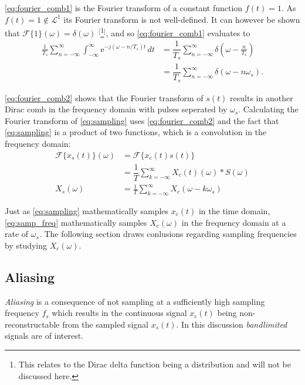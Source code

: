 \eqref{eq:fourier_comb1} is the Fourier transform of a constant function $f(t) = 1$. As $f(t) = 1 \notin \mathcal{L}^1$ its Fourier transform is not well-defined. It can however be shown that $\mathcal{F}\{1\}(\omega) = \delta(\omega)$ $^[$\footnote{This relates to the Dirac delta function being a distribution and will not be discussed here.}$^]$, and so \eqref{eq:fourier_comb1} evaluates to
\begin{align} \label{eq:fourier_comb2}
\frac{1}{T_s} \sum_{n=-\infty}^{\infty} \int_{-\infty}^{\infty} \! \mathrm{e}^{-j(\omega-n/T_s)t} \, dt &= \dfrac{1}{T_s}\sum_{n=-\infty}^{\infty} \delta(\omega-\frac{n}{T_s}) \nonumber \\
&= \dfrac{1}{T_s} \sum_{n=-\infty}^{\infty} \delta(\omega-n\omega_s).
\end{align}

\eqref{eq:fourier_comb2} shows that the Fourier transform of $s(t)$ results in another Dirac comb in the frequency domain with pulses seperated by $\omega_s$.
Calculating the Fourier transform of \eqref{eq:sampling} uses \eqref{eq:fourier_comb2} and the fact that \eqref{eq:sampling} is a product of two functions, which is a convolution in the frequency domain:
\begin{align} \label{eq:samp_freq}
\mathcal{F}\{x_s(t)\}(\omega) &= \mathcal{F}\{x_c(t)s(t)\} \nonumber \\
&= \dfrac{1}{T} \sum_{k=-\infty}^{\infty} X_c(t)(\omega) * S(\omega) \nonumber \\
X_s(\omega)&=\frac{1}{T}\sum_{k=-\infty}^{\infty}X_c(\omega-k\omega_s)
\end{align}

Just as \eqref{eq:sampling} mathematically samples $x_c(t)$ in the time domain, \eqref{eq:samp_freq} mathematically samples $X_c(\omega)$ in the frequency domain at a rate of $\omega_s$. The following section draws conlusions regarding sampling frequencies by studying $X_c(\omega)$.

\subsection{Aliasing} \label{sec:aliasing}
\textit{Aliasing} is a consequence of not sampling at a sufficiently high sampling frequency $f_s$ which results in the continuous signal $x_c(t)$ being non-reconstructable from the sampled signal $x_s(t)$. In this discussion \textit{bandlimited} signals are of interest.

